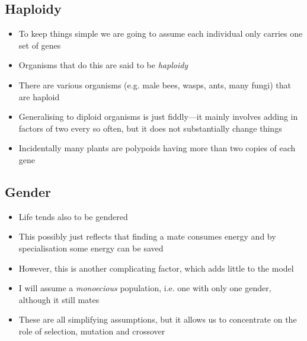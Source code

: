 
\begin{slide}
\section[-1]{Haploidy}

\begin{PauseHighLight}
  \begin{itemize}
  \item To keep things simple we are going to assume each individual
    only carries one set of genes\pause
  \item Organisms that do this are said to be \emph{haploidy}\pause
  \item There are various organisms (e.g. male bees, wasps, ants, many
    fungi) that are haploid\pause
  \item Generalising to diploid organisms is just fiddly\pause---it
    mainly involves adding in factors of two every so often\pauseb,
    but it does not substantially change things\pauseb
  \item Incidentally many plants are polypoids having more than two
    copies of each gene\pause
  \end{itemize}
\end{PauseHighLight}

\end{slide}


\begin{slide}
\section{Gender}

\begin{PauseHighLight}
  \begin{itemize}
  \item Life tends also to be gendered\pause
  \item This possibly just reflects that finding a mate consumes energy
    and by specialisation some energy can be saved\pause
  \item However, this is another complicating factor, which adds little
    to the model\pause
  \item I will assume a \emph{monoecious} population, i.e. one with only
    one gender, although it still mates\pause
  \item These are all simplifying assumptions, but it allows us to
    concentrate on the role of selection, mutation and crossover\pause
  \end{itemize}
\end{PauseHighLight}

\end{slide}



